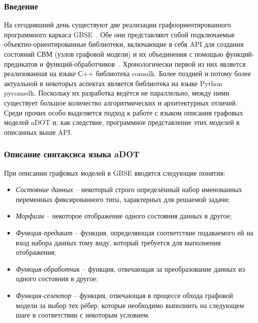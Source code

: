\def\notedate{2022.02.09}
\def\currentauthor{Тришин И.В. (РК6)}
\subsubsection{Введение}
На сегодняшний день существуют две реализации графоориентированного программного каркаса GBSE~\cite{SokolovPershin2018}. Обе они представляют собой подключаемые объектно-ориентированные библиотеки, включающие в себя API для создания состояний СВМ (узлов графовой модели) и их объединения с помощью функций-предикатов и функций-обработчиков~\cite{SokolovPershin2018}. Хронологически первой из них является реализованная на языке С++ библиотека comsdk. Более поздней и потому более актуальной в некоторых аспектах является библиотека на языке Python pycomsdk. Поскольку их разработка ведётся не параллельно, между ними существует большое количество алгоритмических и архитектурных отличий. Среди прочих особо выделяется подход к работе с языком описания графовых моделей aDOT и, как следствие, программное представление этих моделей в описанных выше API.

\subsubsection{Описание синтаксиса языка aDOT}
При описании графовых моделей в GBSE вводятся следующие понятия:
\begin{itemize}
    \item \textit{Состояние данных} -- некоторый строго определённый набор именованных переменных фиксированного типа, характерных для решаемой задачи;
    \item \textit{Морфизм} -- некоторое отображение одного состояния данных в другое;
    \item \textit{Функция-предикат} -- функция, определяющая соответствие подаваемого ей на вход набора данных тому виду, который требуется для выполнения отображения;
    \item \textit{Функция-обработчик} -- функция, отвечающая за преобразование данных из одного состояния в другое;
    \item \textit{Функция-селектор} -- функция, отвечающая в процессе обхода графовой модели за выбор тех рёбер, которые необходимо выполнить на следующем шаге в соответствии с некоторым условием.
\end{itemize}

